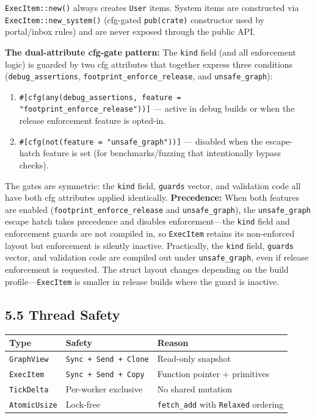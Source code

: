 \documentclass[11pt]{book}
\newcounter{none} %
\providecommand{\tightlist}{%
  \setlength{\itemsep}{0pt}\setlength{\parskip}{0pt}}
\begin{document}
\texttt{ExecItem::new()} always creates \texttt{User} items. System items are
constructed via \texttt{ExecItem::new\_system()} (cfg-gated \texttt{pub(crate)}
constructor used by portal/inbox rules) and are never exposed through the public
API.

\begin{cleverpattern}
\textbf{The dual-attribute cfg-gate pattern:} The \texttt{kind} field (and all
enforcement logic) is guarded by two cfg attributes that together express three
conditions (\texttt{debug\_assertions}, \texttt{footprint\_enforce\_release},
and \texttt{unsafe\_graph}):

\begin{enumerate}
\def\labelenumi{\arabic{enumi}.}
\tightlist
\item
  \texttt{\#[cfg(any(debug\_assertions, feature = "footprint\_enforce\_release"))]}
  --- active in debug builds or when the release enforcement feature is
  opted-in.
\item
  \texttt{\#[cfg(not(feature = "unsafe\_graph"))]} --- disabled when the
  escape-hatch feature is set (for benchmarks/fuzzing that intentionally
  bypass checks).
\end{enumerate}

The gates are symmetric: the \texttt{kind} field, \texttt{guards} vector, and
validation code all have both cfg attributes applied identically.
\textbf{Precedence:} When both features are enabled
(\texttt{footprint\_enforce\_release} and \texttt{unsafe\_graph}), the
\texttt{unsafe\_graph} escape hatch takes precedence and disables
enforcement---the \texttt{kind} field and enforcement guards are not compiled
in, so \texttt{ExecItem} retains its non-enforced layout but enforcement is
silently inactive. Practically, the \texttt{kind} field, \texttt{guards} vector,
and validation code are compiled out under \texttt{unsafe\_graph}, even if
release enforcement is requested. The struct layout changes depending on the
build profile---\texttt{ExecItem} is smaller in release builds where the guard
is inactive.
\end{cleverpattern}

\subsection{5.5 Thread Safety}\label{thread-safety}

{\def\LTcaptype{none} %
\begin{longtable}[]{@{}lll@{}}
\toprule\noalign{}
Type & Safety & Reason \\
\midrule\noalign{}
\endhead
\bottomrule\noalign{}
\endlastfoot
\texttt{GraphView} & \texttt{Sync\ +\ Send\ +\ Clone} & Read-only
snapshot \\
\texttt{ExecItem} & \texttt{Sync\ +\ Send\ +\ Copy} & Function pointer +
primitives \\
\texttt{TickDelta} & Per-worker exclusive & No shared mutation \\
\texttt{AtomicUsize} & Lock-free & \texttt{fetch\_add} with
\texttt{Relaxed} ordering \\
\end{longtable}
}
\end{document}

